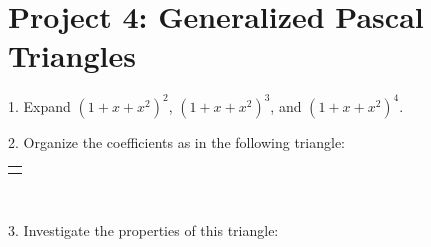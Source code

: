 \documentclass[10pt,]{book}
\theoremstyle{plain}
\theoremstyle{definition}
\theoremstyle{definition}
\theoremstyle{definition}
\numberwithin{equation}{chapter}
\newlength{\panelmax}
\begin{document}
\section[{Project 4: Generalized Pascal Triangles}]{Project 4: Generalized Pascal Triangles}\label{exercises-4}
\begin{exerciselist}
\item[1.]\hypertarget{exercise-27}{}\hypertarget{p-1697}{}%
Expand \({\left( 1 + x + x^{2} \right)}^{2}\), \(\left( 1 + x + x^{2} \right)^{3}\), and \(\left( 1 + x + x^{2} \right)^{4}\).%
\par\smallskip
\item[2.]\hypertarget{exercise-28}{}\hypertarget{p-1698}{}%
Organize the coefficients as in the following triangle:%
{%
\setlength{\panelmax}{0pt}
\ifdefined\panelboxAtabular\else\newsavebox{\panelboxAtabular}\fi%
\ifdefined\phAtabular\else\newlength{\phAtabular}\fi%
\setlength{\phAtabular}{\ht\panelboxAtabular+\dp\panelboxAtabular}
\settototalheight{\phAtabular}{\usebox{\panelboxAtabular}}
\setlength{\panelmax}{\maxof{\panelmax}{\phAtabular}}
\leavevmode%
\setlength{\tabcolsep}{0\linewidth}
\par\medskip\noindent
\hspace*{0.1\linewidth}%
\begin{tabular}{@{}*{1}{c}@{}}
\begin{minipage}[c][\panelmax][t]{0.8\linewidth}\usebox{\panelboxAtabular}\end{minipage}\end{tabular}\\
}%
\par\smallskip
\item[3.]\hypertarget{exercise-29}{}\hypertarget{p-1699}{}%
Investigate the properties of this triangle: \leavevmode%
\begin{enumerate}[label=(\alph*)]

\end{enumerate}
\end{exerciselist}
\end{document}
